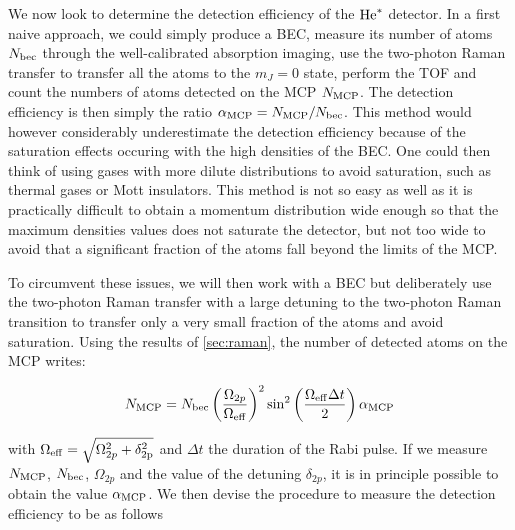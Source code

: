 \label{sec:detection_efficiency}

We now look to determine the detection efficiency of the $\mathrm{He}^*$ detector. In a first naive approach, we could simply produce a BEC, measure its number of atoms $N_{\rm{bec}}$ through the well-calibrated absorption imaging, use the two-photon Raman transfer to transfer all the atoms to the $m_J=0$ state, perform the TOF and count the numbers of atoms detected on the MCP $N_{\rm{MCP}}$. The detection efficiency is then simply the ratio $\alpha_{\rm{MCP}}= N_{\rm{MCP}}/N_{\rm{bec}}$. This method would however considerably underestimate the detection efficiency because of the saturation effects occuring with the high densities of the BEC. One could then think of using gases with more dilute distributions to avoid saturation, such as thermal gases or Mott insulators. This method is not so easy as well as it is practically difficult to obtain a momentum distribution wide enough so that the maximum densities values does not saturate the detector, but not too wide to avoid that a significant fraction of the atoms fall beyond the limits of the MCP.

To circumvent these issues, we will then work with a BEC but deliberately use the two-photon Raman transfer with a large detuning to the two-photon Raman transition to transfer only a very small fraction of the atoms and avoid saturation. Using the results of \ref{sec:raman}, the number of detected atoms on the MCP writes:

\begin{equation}
    N_{\rm{MCP}}=N_{\rm{bec}} \left(\frac{\Omega_{2 p}}{\Omega_{\rm{eff}}}\right)^{2} \sin ^{2}\left(\frac{\Omega_{\rm{eff}}  \Delta t}{2}\right) \alpha_{\rm{MCP}}
\end{equation}

\noindent with  $\Omega_{\rm{eff}}= \sqrt{\Omega_{2p}^2 + \delta_{\rm{2p}}^2}$ and $\Delta t$ the duration of the Rabi pulse. If we measure $N_{\rm{MCP}}$, $N_{\rm{bec}}$, $\Omega_{2p}$ and the value of the detuning  $\delta_{2p}$, it is in principle possible to obtain the value $\alpha_{\rm{MCP}}$. We then devise the procedure to measure the detection efficiency to be as follows

